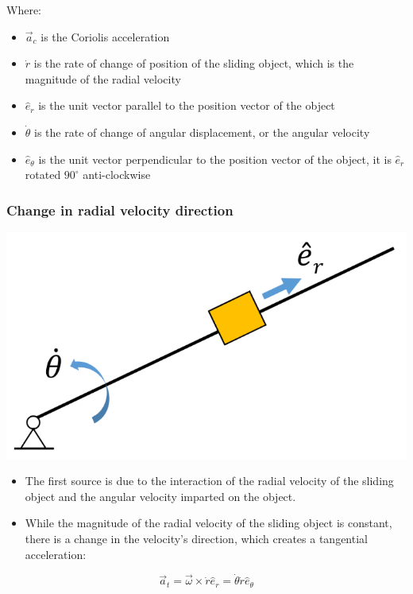 \documentclass[11pt]{article}
\begin{document}
Where:
\begin{itemize}
\item \(\vec{a}_c\) is the Coriolis acceleration
\item \(\dot{r}\) is the rate of change of position of the sliding object, which is the magnitude of the radial velocity
\item \(\hat{e}_r\) is the unit vector parallel to the position vector of the object
\item \(\dot{\theta}\) is the rate of change of angular displacement, or the angular velocity
\item \(\hat{e}_{\theta}\) is the unit vector perpendicular to the position vector of the object, it is \(\hat{e}_r\) rotated \(90^{\circ}\) anti-clockwise
\end{itemize}

 \newpage
\subsubsection{Change in radial velocity direction}
\label{sec:org0e6c3b6}
\begin{center}
\includegraphics[width=.9\linewidth]{./images/change-in-radial-velocity-direction-coriolis-acceleration.png}
\end{center}
\begin{itemize}
\item The first source is due to the interaction of the radial velocity of the sliding object and the angular velocity imparted on the object.
\item While the magnitude of the radial velocity of the sliding object is constant, there is a change in the velocity's direction, which creates a tangential acceleration:
\end{itemize}

\[\vec{a}_t = \vec{\omega} \times \dot{r} \hat{e}_r = \dot{\theta} \dot{r} \hat{e}_{\theta}\]
\end{document}
